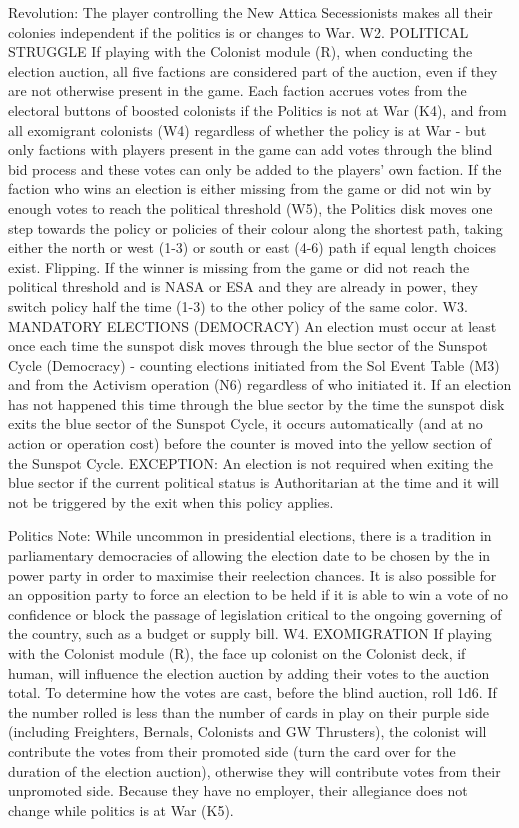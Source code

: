 \documentclass[a4paper]{book}
\begin{document}
Revolution: The player controlling the New Attica Secessionists makes all their colonies independent if the politics is or changes to War.
W2. POLITICAL STRUGGLE
If playing with the Colonist module (R), when conducting the election auction, all five factions are considered part of the auction, even if they are not otherwise present in the game.
Each faction accrues votes from the electoral buttons of boosted colonists if the Politics is not at War (K4), and from all exomigrant colonists (W4) regardless of whether the policy is at War - but only factions with players present in the game can add votes through the blind bid process and these votes can only be added to the players’ own faction.
If the faction who wins an election is either missing from the game or did not win by enough votes to reach the political threshold (W5), the Politics disk moves one step towards the policy or policies of their colour along the shortest path, taking either the north or west (1-3) or south or east (4-6) path if equal length choices exist.
Flipping. If the winner is missing from the game or did not reach the political threshold and is NASA or ESA and they are already in power, they switch policy half the time (1-3) to the other policy of the same color.
W3. MANDATORY ELECTIONS (DEMOCRACY)
An election must occur at least once each time the sunspot disk moves through the blue sector of the Sunspot Cycle (Democracy) - counting elections initiated from the Sol Event Table (M3) and from the Activism operation (N6) regardless of who initiated it. If an election has not happened this time through the blue sector by the time the sunspot disk exits the blue sector of the Sunspot Cycle, it occurs automatically (and at no action or operation cost) before the counter is moved into the yellow section of the Sunspot Cycle.
EXCEPTION: An election is not required when exiting the blue sector if the current political status is Authoritarian at the time and it will not be triggered by the exit when this policy applies.

Politics Note: While uncommon in presidential elections, there is a tradition in parliamentary democracies of allowing the election date to be chosen by the in power party in order to maximise their reelection chances. It is also possible for an opposition party to force an election to be held if it is able to win a vote of no confidence or block the passage of legislation critical to the ongoing governing of the country, such as a budget or supply bill.
W4. EXOMIGRATION
If playing with the Colonist module (R), the face up colonist on the Colonist deck, if human, will influence the election auction by adding their votes to the auction total. To determine how the votes are cast, before the blind auction, roll 1d6. If the number rolled is less than the number of cards in play on their purple side (including Freighters, Bernals, Colonists and GW Thrusters), the colonist will contribute the votes from their promoted side (turn the card over for the duration of the election auction), otherwise they will contribute votes from their unpromoted side. Because they have no employer, their allegiance does not change while politics is at War (K5).
\end{document}
